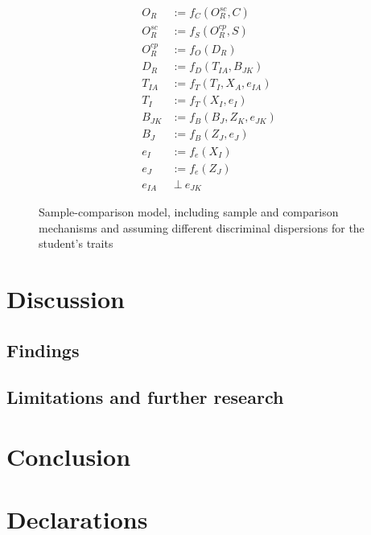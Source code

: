 \documentclass[
  authoryear,
  review,
  1p]{elsarticle}
\begin{document}
\begin{figure}[H]
\begin{minipage}{0.50\linewidth}
{\[
\begin{aligned}
  O_{R} & := f_{C}(O^{sc}_{R}, C) \\
  O^{sc}_{R} & := f_{S}(O^{cp}_{R}, S) \\
  O^{cp}_{R} & := f_{O}(D_{R}) \\
  D_{R} & := f_{D}(T_{IA}, B_{JK}) \\
  T_{IA} & := f_{T}(T_{I}, X_{A}, e_{IA}) \\
  T_{I} & := f_{T}(X_{I}, e_{I}) \\
  B_{JK} & := f_{B}(B_{J}, Z_{K}, e_{JK}) \\
  B_{J} & := f_{B}(Z_{J}, e_{J}) \\
  e_{I} & := f_{e}(X_{I}) \\
  e_{J} & := f_{e}(Z_{J}) \\
  e_{IA} & \:\bot\:e_{JK}
\end{aligned}
\]

}


\end{minipage}%

\caption{\label{fig-cj15}Sample-comparison model, including sample and
comparison mechanisms and assuming different discriminal dispersions for
the student's traits}

\end{figure}%

\section{Discussion}\label{sec-discussion}

\subsection{Findings}\label{sec-discussion-finding}

\subsection{Limitations and further
research}\label{sec-discussion-limitations}

\section{Conclusion}\label{sec-conclusion}

\newpage{}

\section*{Declarations}\label{declarations}
\end{document}
